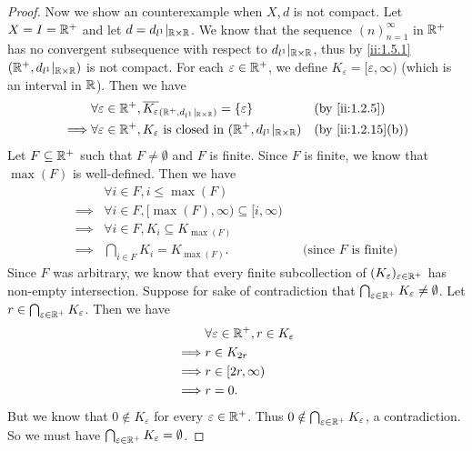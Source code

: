 \begin{proof}
  Now we show an counterexample when \(X, d\) is not compact.
  Let \(X = I = \mathbb{R}^+\) and let \(d = d_{l^1}|_{\mathbb{R} \times \mathbb{R}}\).
  We know that the sequence \((n)_{n = 1}^\infty\) in \(\mathbb{R}^+\) has no convergent subsequence with respect to \(d_{l^1}|_{\mathbb{R} \times \mathbb{R}}\), thus by \cref{ii:1.5.1} \((\mathbb{R}^+, d_{l^1}|_{\mathbb{R} \times \mathbb{R}})\) is not compact.
  For each \(\varepsilon \in \mathbb{R}^+\), we define \(K_\varepsilon = [\varepsilon, \infty)\) (which is an interval in \(\mathbb{R}\)).
  Then we have
  \begin{align*}
             & \forall \varepsilon \in \R^+, \overline{K_\varepsilon}_{(\R^+, d_{l^1}|_{\R \times \R})} = \set{\varepsilon} &  & \by{ii:1.2.5}     \\
    \implies & \forall \varepsilon \in \R^+, K_\varepsilon \text{ is closed in } (\R^+, d_{l^1}|_{\R \times \R})            &  & \by{ii:1.2.15}[b]
  \end{align*}
  Let \(F \subseteq \mathbb{R}^+\) such that \(F \neq \emptyset\) and \(F\) is finite.
  Since \(F\) is finite, we know that \(\max(F)\) is well-defined.
  Then we have
  \begin{align*}
             & \forall i \in F, i \leq \max(F)                                                              \\
    \implies & \forall i \in F, [\max(F), \infty) \subseteq [i, \infty)                                     \\
    \implies & \forall i \in F, K_i \subseteq K_{\max(F)}                                                   \\
    \implies & \bigcap_{i \in F} K_i = K_{\max(F)}.                     &  & \text{(since \(F\) is finite)}
  \end{align*}
  Since \(F\) was arbitrary, we know that every finite subcollection of \((K_\varepsilon)_{\varepsilon \in \mathbb{R}^+}\) has non-empty intersection.
  Suppose for sake of contradiction that \(\bigcap_{\varepsilon \in \mathbb{R}^+} K_\varepsilon \neq \emptyset\).
  Let \(r \in \bigcap_{\varepsilon \in \mathbb{R}^+} K_\varepsilon\).
  Then we have
  \begin{align*}
             & \forall \varepsilon \in \mathbb{R}^+, r \in K_\varepsilon \\
    \implies & r \in K_{2r}                                      \\
    \implies & r \in [2r, \infty)                                \\
    \implies & r = 0.
  \end{align*}
  But we know that \(0 \notin K_\varepsilon\) for every \(\varepsilon \in \mathbb{R}^+\).
  Thus \(0 \notin \bigcap_{\varepsilon \in \mathbb{R}^+} K_\varepsilon\), a contradiction.
  So we must have \(\bigcap_{\varepsilon \in \mathbb{R}^+} K_\varepsilon = \emptyset\).
\end{proof}
